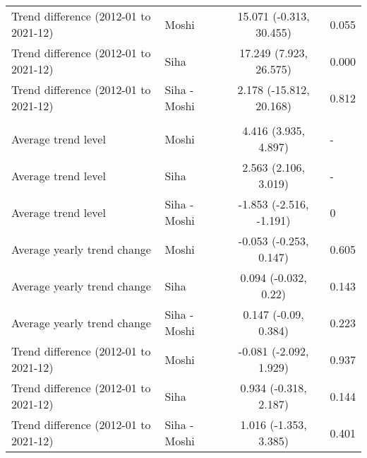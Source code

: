 \begin{longtable}{l|lcl}
Trend difference (2012-01 to 2021-12) & Moshi & 15.071 (-0.313, 30.455) & 0.055 \\ 
Trend difference (2012-01 to 2021-12) & Siha & 17.249 (7.923, 26.575) & 0.000 \\ 
Trend difference (2012-01 to 2021-12) & Siha - Moshi & 2.178 (-15.812, 20.168) & 0.812 \\ 
\midrule\addlinespace[2.5pt]
\multicolumn{4}{l}{No. rain days } \\ 
\midrule\addlinespace[2.5pt]
Average trend level & Moshi & 4.416 (3.935, 4.897) & - \\ 
Average trend level & Siha & 2.563 (2.106, 3.019) & - \\ 
Average trend level & Siha - Moshi & -1.853 (-2.516, -1.191) & 0 \\ 
Average yearly trend change & Moshi & -0.053 (-0.253, 0.147) & 0.605 \\ 
Average yearly trend change & Siha & 0.094 (-0.032, 0.22) & 0.143 \\ 
Average yearly trend change & Siha - Moshi & 0.147 (-0.09, 0.384) & 0.223 \\ 
Trend difference (2012-01 to 2021-12) & Moshi & -0.081 (-2.092, 1.929) & 0.937 \\ 
Trend difference (2012-01 to 2021-12) & Siha & 0.934 (-0.318, 2.187) & 0.144 \\ 
Trend difference (2012-01 to 2021-12) & Siha - Moshi & 1.016 (-1.353, 3.385) & 0.401 \\ 
\bottomrule
\end{longtable}

